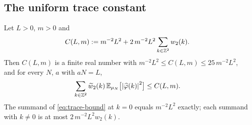 \subsection{The uniform trace constant}

\begin{lemma}\label{lem:trace-constant}
Let $L>0$, $m>0$ and
\begin{equation}\label{eq:trace-constant}
  C(L,m):=m^{-2}L^{2}+2\,m^{-2}L^{2}\sum_{k\in\mathbb{Z}^2}w_2(k).
\end{equation}
Then $C(L,m)$ is a finite real number with
$m^{-2}L^{2}\le C(L,m)\le 25\,m^{-2}L^{2}$, and for every $N$, $a$ with
$aN=L$,
\begin{equation}\label{eq:trace-bound}
  \sum_{k\in\mathbb{Z}^2}\widetilde w_2(k)\,
  \mathbb{E}_{\mu_N}\bigl[\left| \widehat\varphi(k) \right|^{2}\bigr]\le C(L,m).
\end{equation}
The summand of \eqref{eq:trace-bound} at $k=0$ equals $m^{-2}L^{2}$
exactly; each summand with $k\ne0$ is at most $2\,m^{-2}L^{2}w_2(k)$.
\end{lemma}

